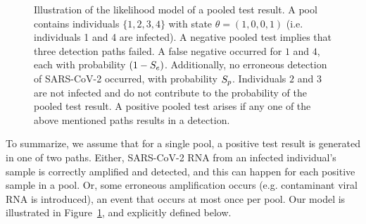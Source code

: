 \documentclass{article}
\begin{document}
\begin{figure}[H]
  \centering
  \caption{Illustration of the likelihood model of a pooled test
    result. A pool contains individuals $\{1,2,3,4\}$ with state
    $\theta=(1,0,0,1)$ (i.e. individuals 1 and 4 are infected). A
    negative pooled test implies that three detection paths failed. A
    false negative occurred for $1$ and $4$, each with probability
    $(1-S_e)$. Additionally, no erroneous detection of SARS-CoV-2
    occurred, with probability $S_p$. Individuals $2$ and $3$ are
    not infected and do not contribute to the probability of the
    pooled test result. A positive pooled test arises if any one of
    the above mentioned paths results in a
    detection.}\label{fig:likelihood}
\end{figure}

To summarize, we assume that for a single pool, a positive test result
is generated in one of two paths. Either, SARS-CoV-2 RNA from an
infected individual's sample is correctly amplified and detected, and
this can happen for each positive sample in a pool. Or, some erroneous
amplification occurs (e.g. contaminant viral RNA is introduced), an
event that occurs at most once per pool. Our model is illustrated in
Figure~\ref{fig:likelihood}, and explicitly defined below. 
\end{document}

